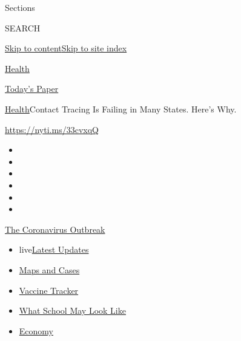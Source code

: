 Sections

SEARCH

\protect\hyperlink{site-content}{Skip to
content}\protect\hyperlink{site-index}{Skip to site index}

\href{https://www.nytimes.com/section/health}{Health}

\href{https://myaccount.nytimes.com/auth/login?response_type=cookie\&client_id=vi}{}

\href{https://www.nytimes.com/section/todayspaper}{Today's Paper}

\href{/section/health}{Health}\textbar{}Contact Tracing Is Failing in
Many States. Here's Why.

\url{https://nyti.ms/33cvxqQ}

\begin{itemize}
\item
\item
\item
\item
\item
\item
\end{itemize}

\href{https://www.nytimes.com/news-event/coronavirus?action=click\&pgtype=Article\&state=default\&region=TOP_BANNER\&context=storylines_menu}{The
Coronavirus Outbreak}

\begin{itemize}
\tightlist
\item
  live\href{https://www.nytimes.com/2020/08/01/world/coronavirus-covid-19.html?action=click\&pgtype=Article\&state=default\&region=TOP_BANNER\&context=storylines_menu}{Latest
  Updates}
\item
  \href{https://www.nytimes.com/interactive/2020/us/coronavirus-us-cases.html?action=click\&pgtype=Article\&state=default\&region=TOP_BANNER\&context=storylines_menu}{Maps
  and Cases}
\item
  \href{https://www.nytimes.com/interactive/2020/science/coronavirus-vaccine-tracker.html?action=click\&pgtype=Article\&state=default\&region=TOP_BANNER\&context=storylines_menu}{Vaccine
  Tracker}
\item
  \href{https://www.nytimes.com/interactive/2020/07/29/us/schools-reopening-coronavirus.html?action=click\&pgtype=Article\&state=default\&region=TOP_BANNER\&context=storylines_menu}{What
  School May Look Like}
\item
  \href{https://www.nytimes.com/live/2020/07/31/business/stock-market-today-coronavirus?action=click\&pgtype=Article\&state=default\&region=TOP_BANNER\&context=storylines_menu}{Economy}
\end{itemize}

